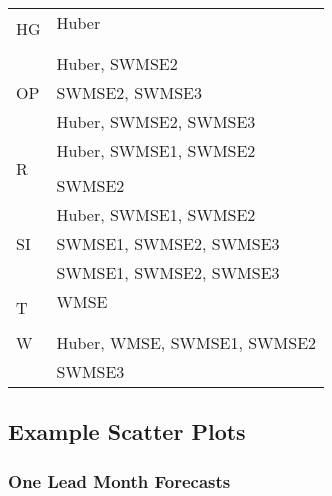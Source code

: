 \documentclass[11pt, a4paper]{article}
\begin{document}
\begin{table}[H]
\begin{tabular}{ll}
\multirow{3}{*}{HG}                   & Huber                                        \\
                                      &                                              \\
                                      &                                              \\ \hline
\multirow{3}{*}{OP}                   & Huber, SWMSE2                                \\
                                      & SWMSE2, SWMSE3                               \\
                                      & Huber, SWMSE2, SWMSE3                        \\ \hline
\multirow{3}{*}{R}                    & Huber, SWMSE1, SWMSE2                        \\
                                      &                                              \\
                                      & SWMSE2                                       \\ \hline
\multirow{3}{*}{SI}                   & Huber, SWMSE1, SWMSE2                        \\
                                      & SWMSE1, SWMSE2, SWMSE3                       \\
                                      & SWMSE1, SWMSE2, SWMSE3                       \\ \hline
\multirow{3}{*}{T}                    & WMSE                                         \\
                                      &                                              \\
                                      &                                              \\ \hline
W                                     & Huber, WMSE, SWMSE1, SWMSE2                  \\
                                      & SWMSE3
\end{tabular}
\end{table}

\subsection{Example Scatter Plots}\label{apd:scatter}

\subsubsection{One Lead Month Forecasts}
\end{document}
